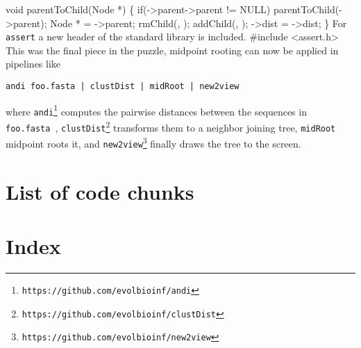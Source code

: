   void parentToChild(Node *) \{
    if(->parent->parent != NULL)
        parentToChild(->parent);
    Node * = ->parent;
    rmChild(, );
    addChild(, );
    ->dist = ->dist;
  \}
\nwendcode{}\nwdocspar
For \texttt{assert} a new header of the standard library is included.
\nwenddocs{}\plusendmoddef\nwstartdeflinemarkup{}\nwenddeflinemarkup
#include <assert.h>
\nwendcode{}\nwdocspar
This was the final piece in the puzzle, midpoint rooting can now be
applied in pipelines like
\begin{verbatim}
andi foo.fasta | clustDist | midRoot | new2view
\end{verbatim}
where
\texttt{andi}\footnote{\texttt{https://github.com/evolbioinf/andi}}
computes the pairwise distances between the sequences in
\texttt{foo.fasta}~\cite{hau15:and},
\texttt{clustDist}\footnote{\texttt{https://github.com/evolbioinf/clustDist}}
transforms them to a neighbor joining tree, \texttt{midRoot} midpoint
roots it, and
\texttt{new2view}\footnote{\texttt{https://github.com/evolbioinf/new2view}}
finally draws the tree to the screen.
\nwenddocs{}\nwdocspar
\section{List of code chunks}
\nowebchunks
\section{Index}
\nowebindex
\nwenddocs{}

